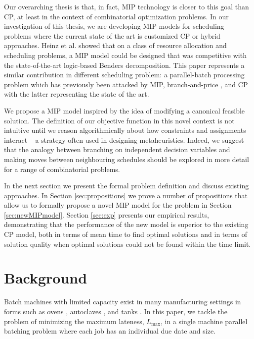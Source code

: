 \documentclass[oribibl]{llncs}
\def\Lmax{{L_{\mathrm{max}}}}
\begin{document}
Our overarching thesis is that, in fact, MIP technology is closer to
this goal than CP, at least in the context of combinatorial optimization
problems. In our investigation of this thesis, we are developing MIP
models for scheduling problems where the current state of the art is
customized CP or hybrid approaches. Heinz et al. \cite{Heinz} showed
that on a class of resource allocation and scheduling problems, a MIP
model could be designed that was competitive with the state-of-the-art
logic-based Benders decomposition. This paper represents a
similar contribution in different scheduling problem: a parallel-batch
processing problem which has previously been attacked by MIP,
branch-and-price \cite{Daste1}, and CP \cite{Malapert} with the latter representing
the state of the art.

We propose a MIP model inspired by the idea of modifying
a canonical feasible solution.
The definition of our objective function in this novel context is not
intuitive until we reason algorithmically about how constraints and
assignments interact -- a strategy often used in designing metaheuristics.
Indeed, we suggest that the analogy between branching
on independent decision variables and making moves between
neighbouring schedules should be explored in more detail for a range of
combinatorial problems.

In the next section we
present the formal problem definition and discuss existing approaches.
In Section \ref{sec:propositions} we prove a number of
propositions that allow us to formally propose a novel MIP model for the problem
in Section \ref{sec:newMIPmodel}.
Section \ref{sec:exp} presents our empirical results, demonstrating
that the performance of the new model is superior to the existing CP
model, both in terms of mean time to find optimal solutions and in terms of solution quality when optimal
solutions could not be found within the time limit.

\section{Background}
\label{sec:background}

Batch machines with limited capacity exist in many manufacturing
settings in forms such as ovens \cite{Lee}, autoclaves \cite{Malapert}, and 
tanks \cite{Grossmann}. In this paper,
we tackle the problem of minimizing the maximum lateness, $\Lmax$,
in a single machine parallel batching problem where each job has an
individual due date and size.
\end{document}
